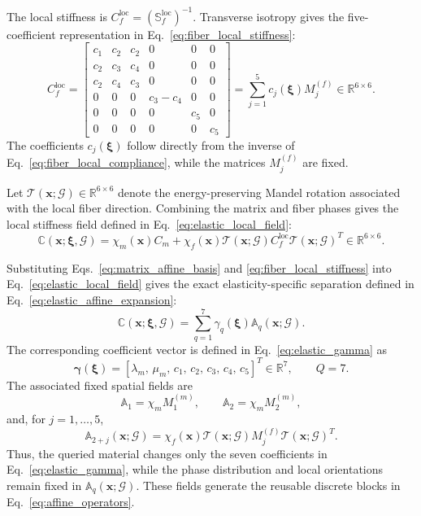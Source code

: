\documentclass[pdflatex,sn-basic,Numbered]{sn-jnl}
\newcommand{\R}{\mathbb{R}}
\newcommand{\G}{\mathcal{G}}
\begin{document}
The local stiffness is
\(C_f^{\mathrm{loc}}=(\mathbb S_f^{\mathrm{loc}})^{-1}\). Transverse isotropy
gives the five-coefficient representation in
Eq.~\eqref{eq:fiber_local_stiffness}:
\begin{equation}
\label{eq:fiber_local_stiffness}
C_f^{\mathrm{loc}}
=
\begin{bmatrix}
c_1 & c_2 & c_2 & 0 & 0 & 0\\
c_2 & c_3 & c_4 & 0 & 0 & 0\\
c_2 & c_4 & c_3 & 0 & 0 & 0\\
0 & 0 & 0 & c_3-c_4 & 0 & 0\\
0 & 0 & 0 & 0 & c_5 & 0\\
0 & 0 & 0 & 0 & 0 & c_5
\end{bmatrix}
=
\sum_{j=1}^{5}
c_j(\boldsymbol\xi)M^{(f)}_j
\in\R^{6\times6}.
\end{equation}
The coefficients \(c_j(\boldsymbol\xi)\) follow directly from the inverse of
Eq.~\eqref{eq:fiber_local_compliance}, while the matrices \(M_j^{(f)}\) are
fixed.

Let \(\mathcal T(\boldsymbol x;\G)\in\R^{6\times6}\) denote the
energy-preserving Mandel rotation associated with the local fiber direction.
Combining the matrix and fiber phases gives the local stiffness field defined
in Eq.~\eqref{eq:elastic_local_field}:
\begin{equation}
\label{eq:elastic_local_field}
\mathbb C(\boldsymbol x;\boldsymbol\xi,\G)
=
\chi_m(\boldsymbol x)C_m
+
\chi_f(\boldsymbol x)
\mathcal T(\boldsymbol x;\G)
C_f^{\mathrm{loc}}
\mathcal T(\boldsymbol x;\G)^T
\in\R^{6\times6}.
\end{equation}

Substituting Eqs.~\eqref{eq:matrix_affine_basis} and
\eqref{eq:fiber_local_stiffness} into
Eq.~\eqref{eq:elastic_local_field} gives the exact elasticity-specific
separation defined in Eq.~\eqref{eq:elastic_affine_expansion}:
\begin{equation}
\label{eq:elastic_affine_expansion}
\mathbb C(\boldsymbol x;\boldsymbol\xi,\G)
=
\sum_{q=1}^{7}
\gamma_q(\boldsymbol\xi)
\mathbb A_q(\boldsymbol x;\G).
\end{equation}
The corresponding coefficient vector is defined in
Eq.~\eqref{eq:elastic_gamma} as
\begin{equation}
\label{eq:elastic_gamma}
\boldsymbol\gamma(\boldsymbol\xi)
=
\left[
\lambda_m,\,
\mu_m,\,
c_1,\,
c_2,\,
c_3,\,
c_4,\,
c_5
\right]^T
\in\R^7,
\qquad
Q=7.
\end{equation}
The associated fixed spatial fields are
\[
\mathbb A_1
=
\chi_m M^{(m)}_1,
\qquad
\mathbb A_2
=
\chi_m M^{(m)}_2,
\]
and, for \(j=1,\ldots,5\),
\[
\mathbb A_{2+j}(\boldsymbol x;\G)
=
\chi_f(\boldsymbol x)
\mathcal T(\boldsymbol x;\G)
M^{(f)}_j
\mathcal T(\boldsymbol x;\G)^T.
\]
Thus, the queried material changes only the seven coefficients in
Eq.~\eqref{eq:elastic_gamma}, while the phase distribution and local
orientations remain fixed in \(\mathbb A_q(\boldsymbol x;\G)\). These fields
generate the reusable discrete blocks in Eq.~\eqref{eq:affine_operators}.
\end{document}
